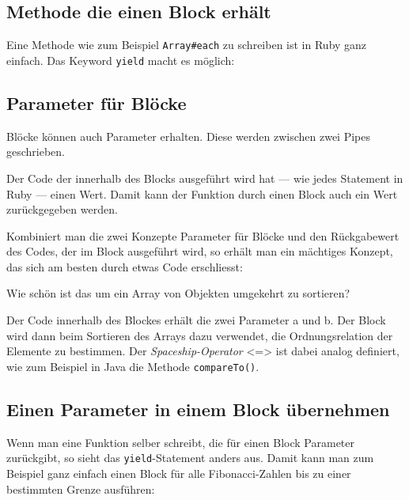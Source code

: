 \documentclass[a4book,11pt,twoside]{scrbook}
\begin{document}
\subsection*{Methode die einen Block erhält} %
\label{sub:methode_die_einen_block_erhält}
Eine Methode wie zum Beispiel \texttt{Array\#each} zu schreiben ist in Ruby ganz einfach. Das Keyword \texttt{yield} macht es möglich:



\subsection*{Parameter für Blöcke} %
\label{sub:parameter_für_blöcke}
Blöcke können auch Parameter erhalten. Diese werden zwischen zwei Pipes geschrieben.


Der Code der innerhalb des Blocks ausgeführt wird hat — wie jedes Statement in Ruby — einen Wert. Damit kann der Funktion durch einen Block auch ein Wert zurückgegeben werden.

Kombiniert man die zwei Konzepte Parameter für Blöcke und den Rückgabewert des Codes, der im Block ausgeführt wird, so erhält man ein mächtiges Konzept, das sich am besten durch etwas Code erschliesst:



Wie schön ist das um ein Array von Objekten umgekehrt zu sortieren?

Der Code innerhalb des Blockes erhält die zwei Parameter a und b. Der Block wird dann beim Sortieren des Arrays dazu verwendet, die Ordnungsrelation der Elemente zu bestimmen. Der \emph{Spaceship-Operator} <=> ist dabei analog definiert, wie zum Beispiel in Java die Methode \texttt{compareTo()}.

\subsection*{Einen Parameter in einem Block übernehmen} %
\label{sub:subsection_name}
Wenn man eine Funktion selber schreibt, die für einen Block Parameter zurückgibt, so sieht das \texttt{yield}-Statement anders aus. Damit kann man zum Beispiel ganz einfach einen Block für alle Fibonacci-Zahlen bis zu einer bestimmten Grenze ausführen:


\end{document}
